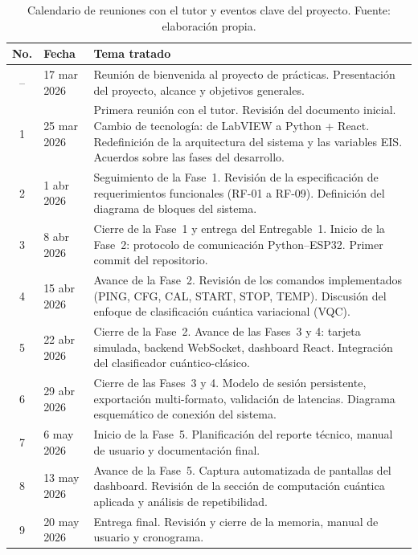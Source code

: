 \documentclass[11pt,a4paper,spanish]{book}
\begin{document}
\begin{table}[ht]
\centering
\begin{tabular}{c l p{9cm}}
\hline\hline
No. & Fecha & Tema tratado \\ [0.5ex]
\hline
-- & 17 mar 2026 & Reuni\'{o}n de bienvenida al proyecto de pr\'{a}cticas. Presentaci\'{o}n del proyecto, alcance y objetivos generales. \\ \hline
1 & 25 mar 2026 & Primera reuni\'{o}n con el tutor. Revisi\'{o}n del documento inicial. Cambio de tecnolog\'{i}a: de LabVIEW a Python + React. Redefinici\'{o}n de la arquitectura del sistema y las variables EIS. Acuerdos sobre las fases del desarrollo. \\ \hline
2 & 1 abr 2026 & Seguimiento de la Fase~1. Revisi\'{o}n de la especificaci\'{o}n de requerimientos funcionales (RF-01 a RF-09). Definici\'{o}n del diagrama de bloques del sistema. \\ \hline
3 & 8 abr 2026 & Cierre de la Fase~1 y entrega del Entregable~1. Inicio de la Fase~2: protocolo de comunicaci\'{o}n Python--ESP32. Primer commit del repositorio. \\ \hline
4 & 15 abr 2026 & Avance de la Fase~2. Revisi\'{o}n de los comandos implementados (PING, CFG, CAL, START, STOP, TEMP). Discusi\'{o}n del enfoque de clasificaci\'{o}n cu\'{a}ntica variacional (VQC). \\ \hline
5 & 22 abr 2026 & Cierre de la Fase~2. Avance de las Fases~3 y 4: tarjeta simulada, backend WebSocket, dashboard React. Integraci\'{o}n del clasificador cu\'{a}ntico-cl\'{a}sico. \\ \hline
6 & 29 abr 2026 & Cierre de las Fases~3 y 4. Modelo de sesi\'{o}n persistente, exportaci\'{o}n multi-formato, validaci\'{o}n de latencias. Diagrama esquem\'{a}tico de conexi\'{o}n del sistema. \\ \hline
7 & 6 may 2026 & Inicio de la Fase~5. Planificaci\'{o}n del reporte t\'{e}cnico, manual de usuario y documentaci\'{o}n final. \\ \hline
8 & 13 may 2026 & Avance de la Fase~5. Captura automatizada de pantallas del dashboard. Revisi\'{o}n de la secci\'{o}n de computaci\'{o}n cu\'{a}ntica aplicada y an\'{a}lisis de repetibilidad. \\ \hline
9 & 20 may 2026 & Entrega final. Revisi\'{o}n y cierre de la memoria, manual de usuario y cronograma. \\ \hline
\end{tabular}
\caption[Calendario de reuniones]{Calendario de reuniones con el tutor y eventos clave del proyecto. Fuente: elaboraci\'{o}n propia.}
\label{tab:reuniones}
\end{table}
\end{document}
